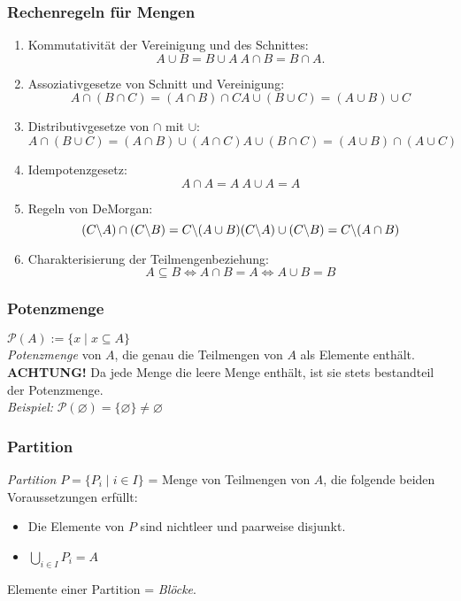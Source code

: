 \subsubsection{Rechenregeln für Mengen}%
\label{ssub:rechenregeln_für_mengen}
\begin{minipage}{0.9\linewidth}
	\begin{enumerate}
		\item Kommutativität der Vereinigung und des Schnittes:
		      \[
			      A\cup B=B\cup A\
			      A\cap B=B\cap A.
		      \]
		\item Assoziativgesetze von Schnitt und Vereinigung:
		      \[
			      A\cap(B\cap C)=(A\cap B)\cap C
			      A\cup(B\cup C)=(A\cup B)\cup C
		      \]
		\item Distributivgesetze von $\cap$ mit $\cup$:
		      \[
			      A\cap(B\cup C)=(A\cap B)\cup (A\cap C)
			      A\cup(B\cap C)=(A\cup B)\cap (A\cup C)
		      \]
		\item Idempotenzgesetz:
		      \[
			      A\cap A=A\
			      A\cup A=A
		      \]
		\item Regeln von DeMorgan:
		      \[
			      (C\backslash A)\cap (C\backslash B)=C\backslash (A\cup B)\\
			      (C\backslash A)\cup (C\backslash B)=C\backslash (A\cap B)
		      \]
		\item Charakterisierung der Teilmengenbeziehung:
		      \[
			      A\subseteq B\Leftrightarrow A\cap B= A\Leftrightarrow A\cup B=B
		      \]
	\end{enumerate}
\end{minipage}

\subsubsection{Potenzmenge}%
\label{ssub:potenzmenge}
\begin{minipage}{0.9\linewidth}
	$\mathcal{P}(A):=\{x\mid x\subseteq A\}$ \\
	\textit{Potenzmenge} von $A$, die genau die Teilmengen von $A$ als Elemente enthält. \\
	\textbf{ACHTUNG!} Da jede Menge die leere Menge enthält, ist sie stets bestandteil der Potenzmenge. \\
	\textit{Beispiel: } $\mathcal{P}(\varnothing)=\{\varnothing\}\neq\varnothing$
\end{minipage}

\subsubsection{Partition}%
\label{ssub:partition}
\begin{minipage}{0.9\linewidth}
	\textit{Partition} $P=\{P_i\mid i\in I \}$ = Menge von Teilmengen von $A$, die folgende beiden Voraussetzungen erfüllt:
	\begin{itemize}
		\item Die Elemente von $P$ sind nichtleer und paarweise disjunkt.
		\item $\bigcup_{i\in I}P_i=A$
	\end{itemize}
	Elemente einer Partition = \textit{Blöcke}.
\end{minipage}

